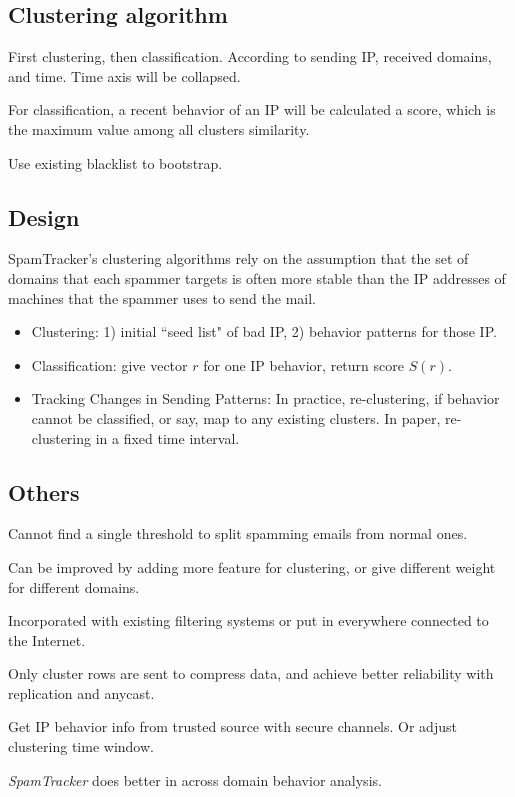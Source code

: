 \documentclass[]{article}
\begin{document}
\subsection{Clustering algorithm}
First clustering, then classification. According to sending IP, received 
domains, and time. Time axis will be collapsed.

For classification, a recent behavior of an IP will be calculated a score,
which is the maximum value among all clusters similarity.

Use existing blacklist to bootstrap. 
 
\subsection{Design}
SpamTracker’s clustering algorithms rely on the assumption that the set 
of domains that each spammer targets is often more stable than the IP
 addresses of machines that the spammer uses to send the mail.
 
\begin{itemize}
 \item Clustering: 1) initial ``seed list" of bad IP, 2) behavior patterns
 for those IP. 
 \item Classification: give vector $r$ for one IP behavior, return score
 $S(r)$.
 \item Tracking Changes in Sending Patterns: In practice, re-clustering, 
 if behavior  cannot be classified, or say, map to any existing clusters. 
 In paper, re-clustering in a fixed time interval.
\end{itemize}

\subsection{Others}
Cannot find a single threshold to split spamming emails from normal
ones.

Can be improved by adding more feature for clustering, or give different
weight for different domains.

Incorporated with existing filtering systems or put in everywhere connected
to the Internet.

Only cluster rows are sent to compress data, and achieve better reliability
with replication and anycast.

Get IP behavior info from trusted source with secure channels. Or adjust
clustering time window.

\textit{SpamTracker} does better in across domain behavior analysis.
\end{document}
